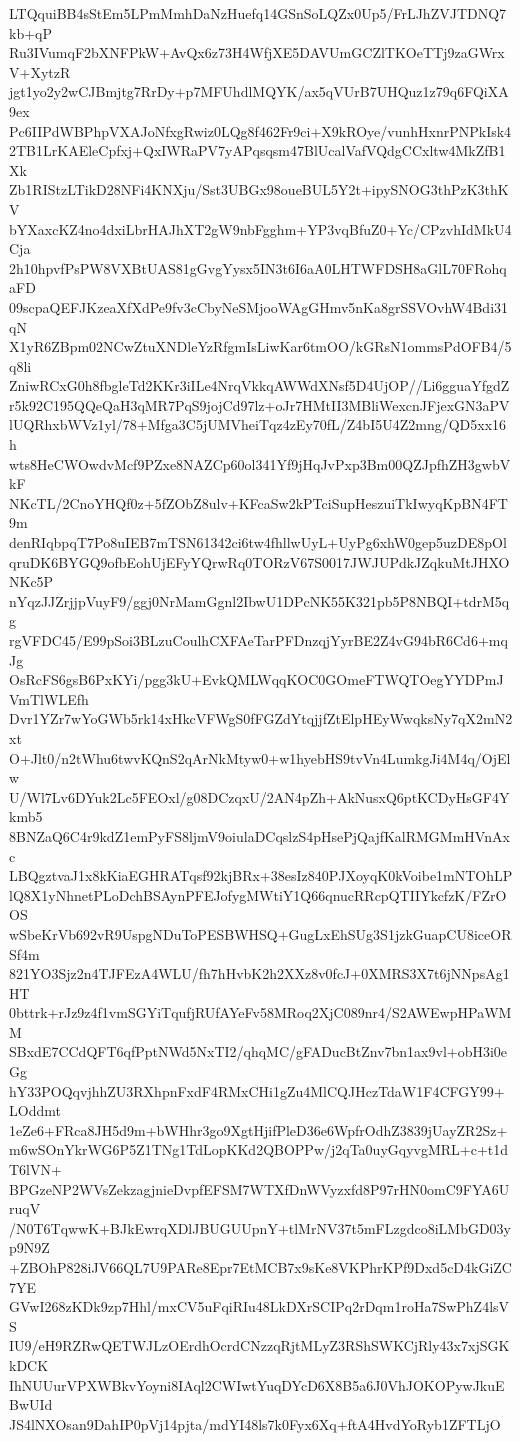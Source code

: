LTQquiBB4sStEm5LPmMmhDaNzHuefq14GSnSoLQZx0Up5/FrLJhZVJTDNQ7kb+qP
Ru3IVumqF2bXNFPkW+AvQx6z73H4WfjXE5DAVUmGCZlTKOeTTj9zaGWrxV+XytzR
jgt1yo2y2wCJBmjtg7RrDy+p7MFUhdlMQYK/ax5qVUrB7UHQuz1z79q6FQiXA9ex
Pc6IIPdWBPhpVXAJoNfxgRwiz0LQg8f462Fr9ci+X9kROye/vunhHxnrPNPkIsk4
2TB1LrKAEleCpfxj+QxIWRaPV7yAPqsqsm47BlUcalVafVQdgCCxltw4MkZfB1Xk
Zb1RIStzLTikD28NFi4KNXju/Sst3UBGx98oueBUL5Y2t+ipySNOG3thPzK3thKV
bYXaxcKZ4no4dxiLbrHAJhXT2gW9nbFgghm+YP3vqBfuZ0+Yc/CPzvhIdMkU4Cja
2h10hpvfPsPW8VXBtUAS81gGvgYysx5IN3t6I6aA0LHTWFDSH8aGlL70FRohqaFD
09scpaQEFJKzeaXfXdPe9fv3cCbyNeSMjooWAgGHmv5nKa8grSSVOvhW4Bdi31qN
X1yR6ZBpm02NCwZtuXNDleYzRfgmIsLiwKar6tmOO/kGRsN1ommsPdOFB4/5q8li
ZniwRCxG0h8fbgleTd2KKr3iILe4NrqVkkqAWWdXNsf5D4UjOP//Li6gguaYfgdZ
r5k92C195QQeQaH3qMR7PqS9jojCd97lz+oJr7HMtII3MBliWexcnJFjexGN3aPV
lUQRhxbWVz1yl/78+Mfga3C5jUMVheiTqz4zEy70fL/Z4bI5U4Z2mng/QD5xx16h
wts8HeCWOwdvMcf9PZxe8NAZCp60ol341Yf9jHqJvPxp3Bm00QZJpfhZH3gwbVkF
NKcTL/2CnoYHQf0z+5fZObZ8ulv+KFcaSw2kPTciSupHeszuiTkIwyqKpBN4FT9m
denRIqbpqT7Po8uIEB7mTSN61342ci6tw4fhllwUyL+UyPg6xhW0gep5uzDE8pOl
qruDK6BYGQ9ofbEohUjEFyYQrwRq0TORzV67S0017JWJUPdkJZqkuMtJHXONKc5P
nYqzJJZrjjpVuyF9/ggj0NrMamGgnl2IbwU1DPcNK55K321pb5P8NBQI+tdrM5qg
rgVFDC45/E99pSoi3BLzuCoulhCXFAeTarPFDnzqjYyrBE2Z4vG94bR6Cd6+mqJg
OsRcFS6gsB6PxKYi/pgg3kU+EvkQMLWqqKOC0GOmeFTWQTOegYYDPmJVmTlWLEfh
Dvr1YZr7wYoGWb5rk14xHkcVFWgS0fFGZdYtqjjfZtElpHEyWwqksNy7qX2mN2xt
O+Jlt0/n2tWhu6twvKQnS2qArNkMtyw0+w1hyebHS9tvVn4LumkgJi4M4q/OjElw
U/Wl7Lv6DYuk2Lc5FEOxl/g08DCzqxU/2AN4pZh+AkNusxQ6ptKCDyHsGF4Ykmb5
8BNZaQ6C4r9kdZ1emPyFS8ljmV9oiulaDCqslzS4pHsePjQajfKalRMGMmHVnAxc
LBQgztvaJ1x8kKiaEGHRATqsf92kjBRx+38esIz840PJXoyqK0kVoibe1mNTOhLP
lQ8X1yNhnetPLoDchBSAynPFEJofygMWtiY1Q66qnucRRcpQTIIYkcfzK/FZrOOS
wSbeKrVb692vR9UspgNDuToPESBWHSQ+GugLxEhSUg3S1jzkGuapCU8iceORSf4m
821YO3Sjz2n4TJFEzA4WLU/fh7hHvbK2h2XXz8v0fcJ+0XMRS3X7t6jNNpsAg1HT
0bttrk+rJz9z4f1vmSGYiTqufjRUfAYeFv58MRoq2XjC089nr4/S2AWEwpHPaWMM
SBxdE7CCdQFT6qfPptNWd5NxTI2/qhqMC/gFADucBtZnv7bn1ax9vl+obH3i0eGg
hY33POQqvjhhZU3RXhpnFxdF4RMxCHi1gZu4MlCQJHczTdaW1F4CFGY99+LOddmt
1eZe6+FRca8JH5d9m+bWHhr3go9XgtHjifPleD36e6WpfrOdhZ3839jUayZR2Sz+
m6wSOnYkrWG6P5Z1TNg1TdLopKKd2QBOPPw/j2qTa0uyGqyvgMRL+c+t1dT6lVN+
BPGzeNP2WVsZekzagjnieDvpfEFSM7WTXfDnWVyzxfd8P97rHN0omC9FYA6UruqV
/N0T6TqwwK+BJkEwrqXDlJBUGUUpnY+tlMrNV37t5mFLzgdco8iLMbGD03yp9N9Z
+ZBOhP828iJV66QL7U9PARe8Epr7EtMCB7x9sKe8VKPhrKPf9Dxd5cD4kGiZC7YE
GVwI268zKDk9zp7Hhl/mxCV5uFqiRIu48LkDXrSCIPq2rDqm1roHa7SwPhZ4lsVS
IU9/eH9RZRwQETWJLzOErdhOcrdCNzzqRjtMLyZ3RShSWKCjRly43x7xjSGKkDCK
IhNUUurVPXWBkvYoyni8IAql2CWIwtYuqDYcD6X8B5a6J0VhJOKOPywJkuEBwUId
JS4lNXOsan9DahIP0pVj14pjta/mdYI48ls7k0Fyx6Xq+ftA4HvdYoRyb1ZFTLjO
